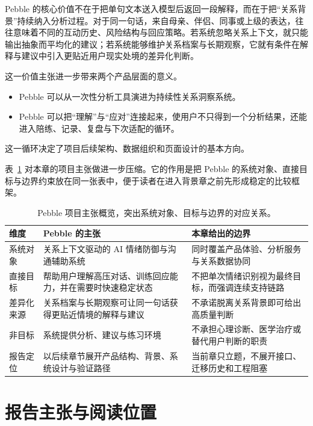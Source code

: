 Pebble 的核心价值不在于把单句文本送入模型后返回一段解释，而在于把“关系背景”持续纳入分析过程。对于同一句话，来自母亲、伴侣、同事或上级的表达，往往意味着不同的互动历史、风险结构与回应策略。若系统忽略关系上下文，就只能输出抽象而平均化的建议；若系统能够维护关系档案与长期观察，它就有条件在解释与建议中引入更贴近用户现实处境的差异化判断。

这一价值主张进一步带来两个产品层面的意义。

\begin{itemize}
  \item Pebble 可以从一次性分析工具演进为持续性关系洞察系统。
  \item Pebble 可以把“理解”与“应对”连接起来，使用户不只得到一个分析结果，还能进入陪练、记录、复盘与下次适配的循环。
\end{itemize}

这一循环决定了项目后续架构、数据组织和页面设计的基本方向。

表~\ref{tab:pebble-project-claim} 对本章的项目主张做进一步压缩。它的作用是把 Pebble 的系统对象、直接目标与边界约束放在同一张表中，便于读者在进入背景章之前先形成稳定的比较框架。

\begin{table}[H]
  \centering
  \caption{Pebble 项目主张概览，突出系统对象、目标与边界的对应关系。}
  \label{tab:pebble-project-claim}
  \begin{tabularx}{\textwidth}{>{\raggedright\arraybackslash}p{2.6cm} >{\raggedright\arraybackslash}X >{\raggedright\arraybackslash}X}
    \toprule
    维度 & Pebble 的主张 & 本章给出的边界 \\
    \midrule
    系统对象 & 关系上下文驱动的 AI 情绪防御与沟通辅助系统 & 同时覆盖产品体验、分析服务与关系数据协同 \\
    直接目标 & 帮助用户理解高压对话、训练回应能力，并在需要时快速稳定状态 & 不把单次情绪识别视为最终目标，而强调连续支持链路 \\
    差异化来源 & 关系档案与长期观察可让同一句话获得更贴近情境的解释与建议 & 不承诺脱离关系背景即可给出高质量判断 \\
    非目标 & 系统提供分析、建议与练习环境 & 不承担心理诊断、医学治疗或替代用户判断的职责 \\
    报告定位 & 以后续章节展开产品结构、背景、系统设计与验证路径 & 当前章只立题，不展开接口、迁移历史和工程阻塞 \\
    \bottomrule
  \end{tabularx}
\end{table}

\section{报告主张与阅读位置}

